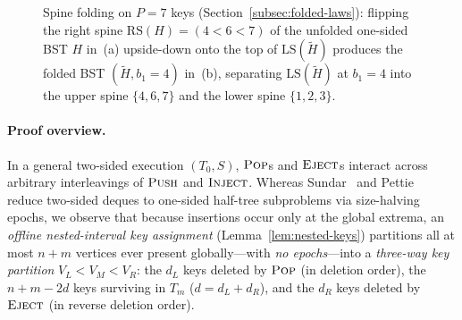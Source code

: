 \documentclass[11pt]{article}
\theoremstyle{definition}
\theoremstyle{remark}
\newcommand{\LS}{\mathrm{LS}}
\newcommand{\RS}{\mathrm{RS}}
\newcommand{\PUSH}{\textnormal{\scshape Push}}
\newcommand{\POP}{\textnormal{\scshape Pop}}
\newcommand{\INJECT}{\textnormal{\scshape Inject}}
\newcommand{\EJECT}{\textnormal{\scshape Eject}}
\newcommand{\SHIFT}{\textnormal{\scshape Shift}}
\newcommand{\UPROT}{\textnormal{\scshape UpperRot}}
\begin{document}
\begin{figure}[ht]
\caption{Spine folding on $P = 7$ keys (Section~\ref{subsec:folded-laws}): flipping the right spine $\RS(H) = (4 < 6 < 7)$ of the unfolded one-sided BST $H$ in~(a) upside-down onto the top of $\LS(\widetilde{H})$ produces the folded BST $(\widetilde{H}, b_1 = 4)$ in~(b), separating $\LS(\widetilde{H})$ at $b_1 = 4$ into the upper spine $\{4, 6, 7\}$ and the lower spine $\{1, 2, 3\}$.}
\label{fig:folded-pop}
\end{figure}

\paragraph{Proof overview.}
In a general two-sided execution $(T_0, S)$, $\POP$s and $\EJECT$s interact across arbitrary interleavings of $\PUSH$ and $\INJECT$. Whereas Sundar~\cite[Section~3, Theorem~7]{Sundar1992} and Pettie~\cite[Section~2]{Pettie2008} reduce two-sided deques to one-sided half-tree subproblems via size-halving epochs, we observe that because insertions occur only at the global extrema, an \emph{offline nested-interval key assignment} (Lemma~\ref{lem:nested-keys}) partitions all at most $n + m$ vertices ever present globally---with \emph{no epochs}---into a \emph{three-way key partition} $V_L < V_M < V_R$: the $d_L$ keys deleted by $\POP$ (in deletion order), the $n + m - 2d$ keys surviving in $T_m$ ($d = d_L + d_R$), and the $d_R$ keys deleted by $\EJECT$ (in reverse deletion order).
\end{document}
